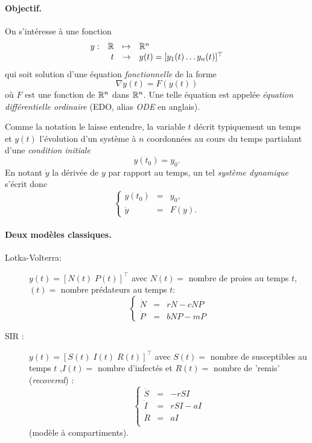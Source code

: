 
\paragraph*{Objectif.} 
On s'intéresse à une fonction 
$$
\begin{array}{rrcl}
  y : & \mathbb{R} & \mapsto & \mathbb{R}^n \\
  & t & \rightarrow & y(t) = [y_1(t) \dots y_n(t)]^\top 
\end{array}
$$
qui soit solution d'une équation {\em fonctionnelle} de la forme
$$
\nabla y(t) = F(y(t))
$$
où $F$ est une fonction de $\mathbb{R}^n$ dans $\mathbb{R}^n$. Une telle équation est appelée {\em équation différentielle ordinaire} (EDO, alias {\em ODE} en anglais).

Comme la notation le laisse entendre, la variable $t$ décrit typiquement un temps et $y(t)$ l'évolution d'un système à $n$ coordonnées au cours du temps partialant d'une {\em condition initiale}
$$
y(t_0) = y_0.
$$
En notant $\dot y$ la dérivée de $y$ par rapport au temps, un tel {\em système dynamique} s'écrit donc
$$
\left\{\begin{array}{rcl}
        y(t_0) & = & y_0, \\
        \dot y & = & F(y).
       \end{array}\right.
$$

\paragraph*{Deux modèles classiques.}
\begin{description}
 \item[Lotka-Volterra:] $y(t) = [N(t) \; P(t)]^\top$ avec $N(t) =$ nombre de proies au temps $t$, $(t) = $ nombre prédateurs au temps $t$:
 $$
 \left\{ \begin{array}{rcl} 
  \dot N & = & r N - c N P \\
  \dot P & = & b N P  - m P
 \end{array} \right.
 $$
 \item[SIR :] $y(t) = [S(t) \; I(t) \; R(t)]^\top$ avec $S(t) =$ nombre de susceptibles au temps $t$ ,$I(t) =$ nombre d'infectés et $R(t) =$ nombre de 'remis' ({\em recovered}) :
 $$
 \left\{ \begin{array}{rcl} 
  \dot S & = & - r S I \\
  \dot I & = & r S I - a I \\
  \dot R & = & a I \\
 \end{array} \right.
 $$
 (modèle à compartiments).
\end{description}

